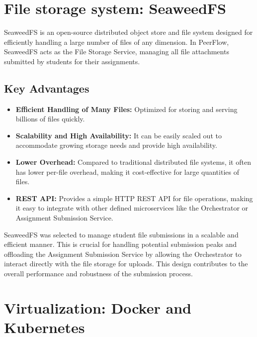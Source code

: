 \section{File storage system: SeaweedFS}

\begin{justify}
SeaweedFS is an open-source distributed object store and file system designed for efficiently handling a large number of files of any dimension. In PeerFlow, SeaweedFS acts as the File Storage Service, managing all file attachments submitted by students for their assignments.
\end{justify}

\subsection{Key Advantages}

\begin{itemize}
\item \textbf{Efficient Handling of Many Files:} Optimized for storing and serving billions of files quickly.
\item \textbf{Scalability and High Availability:} It can be easily scaled out to accommodate growing storage needs and provide high availability.
\item \textbf{Lower Overhead:} Compared to traditional distributed file systems, it often has lower per-file overhead, making it cost-effective for large quantities of files.
\item \textbf{REST API:} Provides a simple HTTP REST API for file operations, making it easy to integrate with other defined microservices like the Orchestrator or Assignment Submission Service.
\end{itemize}

\begin{justify}
SeaweedFS was selected to manage student file submissions in a scalable and efficient manner. This is crucial for handling potential submission peaks  and offloading the Assignment Submission Service by allowing the Orchestrator to interact directly with the file storage for uploads. This design contributes to the overall performance and robustness of the submission process.
\end{justify}

\section{Virtualization: Docker and Kubernetes}

